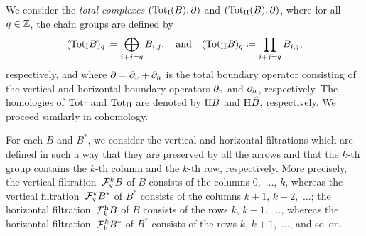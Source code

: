 \documentclass[\MainFolder/Text.tex]{subfiles}
\begin{document}
We consider the \emph{total complexes} $({\mathrm{Tot}_{\mathrm{I}}}(B), \partial)$ and $({\mathrm{Tot}_{\mathrm{II}}}(B),\partial)$, where for all $q\in \mathbb{Z}$, the chain groups are defined by
\[ ({\mathrm{Tot}_{\mathrm{I}}} B)_q \coloneqq \bigoplus_{i + j =q} B_{i,j},\quad\text{and}\quad ({\mathrm{Tot}_{\mathrm{II}}} B)_q \coloneqq \prod_{i + j =q} B_{i,j}, \]
respectively, and where $\partial = \partial_v + \partial_h$ is the total boundary operator consisting of the vertical and horizontal boundary operators $\partial_v$ and $\partial_h$, respectively. 
The homologies of ${\mathrm{Tot}_{\mathrm{I}}}$ and ${\mathrm{Tot}_{\mathrm{II}}}$ are denoted by $\mathrm{H} B$ and $\mathrm{H} \hat{B}$, respectively. We proceed similarly in cohomology.

For each $B$ and $B^*$, we consider the vertical and horizontal filtrations which are defined in such a way that they are preserved by all the arrows and that the $k$-th group contains the $k$-th column and the $k$-th row, respectively. More precisely, the vertical filtration~$\mathcal{F}_{{\mathrm{v}}}^k B$ of $B$ consists of the columns $0$,~$\dotsc$, $k$, whereas the vertical filtration~$\mathcal{F}_{{\mathrm{v}}}^k B^*$ of $B^*$ consists of the columns $k+1$, $k+2$,~$\dotsc$; the horizontal filtration~$\mathcal{F}^{\mathrm{h}}_k B$ of $B$ consists of the rows $k$, $k-1$,~$\dotsc$, whereas the horizontal filtration~$\mathcal{F}_{\mathrm{h}}^k B^*$ of $B^*$ consists of the rows $k$, $k+1$,~$\dotsc$, and so~on.
%
% 
\end{document}

